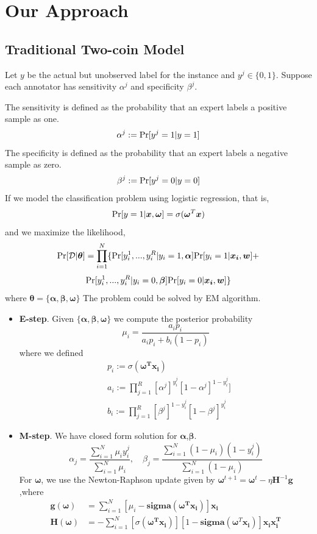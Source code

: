 \documentclass{article}
\begin{document}
\section{Our Approach}
\subsection{Traditional Two-coin Model}
Let $y$ be the actual but unobserved label for the instance and $y^{j} \in \lbrace 0,1 \rbrace$. Suppose each annotator has sensitivity $\alpha^{j}$ and specificity $\beta^{j}$. 

The sensitivity is defined as the probability that an expert labels a positive sample as one.$$\alpha^{j}:=\textup{Pr}[y^{j}=1|y=1]$$
The specificity is defined as the probability that an expert labels a negative sample as zero. $$\beta^{j}:=\textup{Pr}[y^{j}=0|y=0]$$
If we model the classification problem using logistic regression, that is,
$$\textup{Pr}[y=1|\bm{x},\bm{\omega}]=\sigma(\bm{\omega}^{T}\bm{x})$$
and we maximize the likelihood,
$$\textup{Pr}[\mathcal{D}|\bm{\theta}]=\prod^{N}_{i=1}\{\textup{Pr}[y_i^1,...,y_i^R|y_i=1,\bm{\alpha}]\textup{Pr}[y_i=1|\bm{x_i},\bm{w}]+$$
$$\textup{Pr}[y_i^1,...,y_i^R|y_i=0,\bm{\beta}]\textup{Pr}[y_i=0|\bm{x_i},\bm{w}]\}$$
where $\bm{\theta}=\{\bm{\alpha,\beta,\omega}\}$
The problem could be solved by EM algorithm.
\begin{itemize}
    \item \textbf{E-step}. Given $\{\bm{\alpha,\beta,\omega}\}$ we compute the posterior probability
    $$\mu_i = \frac{a_i p_i}{a_i p_i+b_i(1-p_i)}$$
    where we defined
    \begin{align*}
        &p_i:=\sigma(\bm{\omega^T}\bm{x_i})\\
        &a_i:=\prod^R_{j=1}[\alpha^j]^{y_i^j}[1-\alpha^j]^{1-y_i^j}]\\
        &b_i:=\prod^R_{j=1}[\beta^j]^{1-y_i^j}[1-\beta^j]^{y_i^j}
    \end{align*}
    \item \textbf{M-step}. We have closed form solution for $\bm{\alpha}$,$\bm{\beta}$.
    $$\alpha_j=\frac{\sum^N_{i=1}\mu_i y_i^j}{\sum^N_{i=1}\mu_i}, \quad \beta_j=\frac{\sum^N_{i=1}(1-\mu_i)(1-y_i^j)}{\sum^N_{i=1}(1-\mu_i)}$$
    For $\bm{\omega}$, we use the Newton-Raphson update given by $\bm{\omega}^{t+1}=\bm{\omega}^t-\eta\bm{H}^{-1}\bm{g}$,where
    \begin{align*}
        \bm{g(\omega)}&=\sum^N_{i=1}[\mu_i-\bm{sigma}(\bm{\omega^T\bm{x_i}})]\bm{x_i}\\
        \bm{H(\omega)}&=-\sum^N_{i=1}[\sigma(\bm{\omega^T x_i})][1-\bm{sigma}(\bm{\omega}^T\bm{x_i})]\bm{x_ix_i^T}
    \end{align*}
    
\end{itemize}
    
\end{document}
